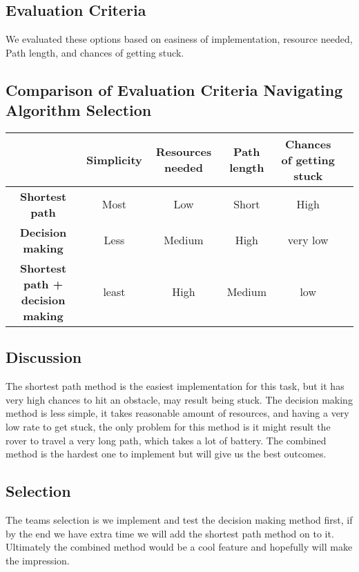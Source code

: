 \documentclass[10pt,letterpaper,onecolumn,journal]{IEEEtran}
\begin{document}
\subsection{Evaluation Criteria}
We evaluated these options based on easiness of implementation, resource needed, Path length, and chances of getting stuck. 
\subsection*{Comparison of Evaluation Criteria Navigating Algorithm Selection}
\begin{center}
  \begin{tabular}{cccccc}
    \hline
    \multicolumn{1}{l}{} & \textbf{Simplicity}  & \textbf{Resources needed}   & \textbf{Path length} & \textbf{Chances of getting stuck}  \\
		\hline
		\textbf{Shortest path}          	& Most      	& Low			 & Short  & High \\
		\hline
		\textbf{Decision making}        	& Less       	&Medium   	     & High  & very low \\
		\hline
		\textbf{Shortest path + decision making} & least     	& High           & Medium    &  low	\\
                \hline
	\end{tabular}
  \end{center}
\vspace{.3cm}

\subsection{Discussion}
The shortest path method is the easiest implementation for this task, but it has very high chances to hit an obstacle, may result being stuck. The decision making method is less simple, it takes reasonable amount of resources, and having a very low rate to get stuck, the only problem for this method is it might result the rover to travel a very long path, which takes a lot of battery. The combined method is the hardest one to implement but will give us the best outcomes. 

\subsection{Selection}
The teams selection is we implement and test the decision making method first, if by the end we have extra time we will add the shortest path method on to it. Ultimately the combined method would be a cool feature and hopefully will make the impression. 
\end{document}
